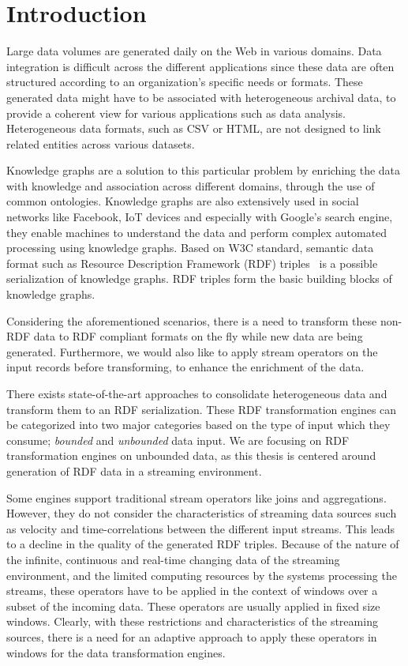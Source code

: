 \chapter{Introduction}
\label{chap:intro}

Large data volumes are generated daily on the Web in various domains.
Data integration is difficult across the different applications since these
data are often structured according to an organization's specific needs or formats. 
These generated data might have to be associated with heterogeneous archival data,  
to provide a coherent view for various applications such as 
data analysis. Heterogeneous data formats, such as CSV or HTML, are not
designed to link related entities across various datasets. 

Knowledge graphs are a solution to
this particular problem by enriching the data with knowledge and association across
different domains, through the use of common ontologies.
Knowledge graphs are also extensively used in social networks like 
Facebook\cite{facebook_linked_data}, IoT devices\cite{graph_of_things} and especially with Google's search
engine\cite{google_kg}, they enable machines to understand the data and perform complex automated processing
using knowledge graphs. 
Based on W3C standard, semantic data format such as Resource Description Framework (RDF)
triples~\cite{intro_rdf} is a possible serialization of knowledge graphs.  
RDF triples form the basic building blocks of knowledge graphs.

Considering the aforementioned scenarios, there is a need to transform these non-RDF data to RDF compliant formats on the fly while
new data are being generated. Furthermore, we would also like to apply stream operators on the input records
before transforming, to enhance the enrichment of the data.

There exists state-of-the-art approaches to consolidate heterogeneous data
and transform them to an RDF serialization. 
These RDF transformation engines can be categorized into two major categories based on the type of input
which they consume; \emph{bounded} and \emph{unbounded} data input. We are focusing on RDF transformation 
engines on unbounded data, as this thesis is centered around generation of RDF data in a streaming environment.  

Some engines support traditional stream operators like joins and aggregations. However, they do not consider
the characteristics of streaming data sources such as velocity and time-correlations between the different
input streams. This leads to a decline in the quality of the generated RDF triples. Because of the nature of the 
infinite, continuous and real-time changing data of the streaming environment, and 
the limited computing resources by the systems processing the streams, 
these operators have to be applied in the context of windows over a subset of the incoming data.
These operators are usually applied in fixed size windows.
Clearly, with these restrictions and characteristics of the streaming sources, there is a need 
for an adaptive approach to apply these operators in windows for the data transformation engines. 

